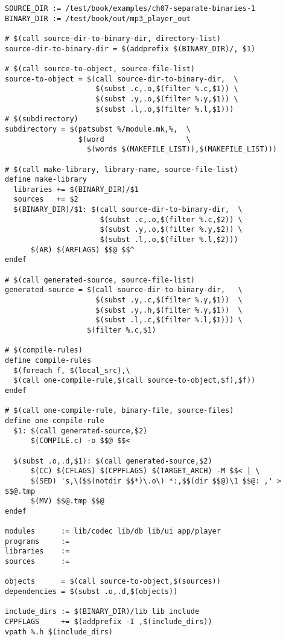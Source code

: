 {\footnotesize
\begin{verbatim}
SOURCE_DIR := /test/book/examples/ch07-separate-binaries-1
BINARY_DIR := /test/book/out/mp3_player_out

# $(call source-dir-to-binary-dir, directory-list)
source-dir-to-binary-dir = $(addprefix $(BINARY_DIR)/, $1)

# $(call source-to-object, source-file-list)
source-to-object = $(call source-dir-to-binary-dir,  \
                     $(subst .c,.o,$(filter %.c,$1)) \
                     $(subst .y,.o,$(filter %.y,$1)) \
                     $(subst .l,.o,$(filter %.l,$1)))
# $(subdirectory)
subdirectory = $(patsubst %/module.mk,%,  \
                 $(word                   \
                   $(words $(MAKEFILE_LIST)),$(MAKEFILE_LIST)))

# $(call make-library, library-name, source-file-list)
define make-library
  libraries += $(BINARY_DIR)/$1
  sources   += $2
  $(BINARY_DIR)/$1: $(call source-dir-to-binary-dir,  \
                      $(subst .c,.o,$(filter %.c,$2)) \
                      $(subst .y,.o,$(filter %.y,$2)) \
                      $(subst .l,.o,$(filter %.l,$2)))
      $(AR) $(ARFLAGS) $$@ $$^
endef

# $(call generated-source, source-file-list)
generated-source = $(call source-dir-to-binary-dir,   \
                     $(subst .y,.c,$(filter %.y,$1))  \
                     $(subst .y,.h,$(filter %.y,$1))  \
                     $(subst .l,.c,$(filter %.l,$1))) \
                   $(filter %.c,$1)

# $(compile-rules)
define compile-rules
  $(foreach f, $(local_src),\
  $(call one-compile-rule,$(call source-to-object,$f),$f))
endef

# $(call one-compile-rule, binary-file, source-files)
define one-compile-rule
  $1: $(call generated-source,$2)
      $(COMPILE.c) -o $$@ $$<

  $(subst .o,.d,$1): $(call generated-source,$2)
      $(CC) $(CFLAGS) $(CPPFLAGS) $(TARGET_ARCH) -M $$< | \
      $(SED) 's,\($$(notdir $$*)\.o\) *:,$$(dir $$@)\1 $$@: ,' > $$@.tmp
      $(MV) $$@.tmp $$@
endef

modules      := lib/codec lib/db lib/ui app/player
programs     :=
libraries    :=
sources      :=

objects      = $(call source-to-object,$(sources))
dependencies = $(subst .o,.d,$(objects))

include_dirs := $(BINARY_DIR)/lib lib include
CPPFLAGS     += $(addprefix -I ,$(include_dirs))
vpath %.h $(include_dirs)


\end{verbatim}}
